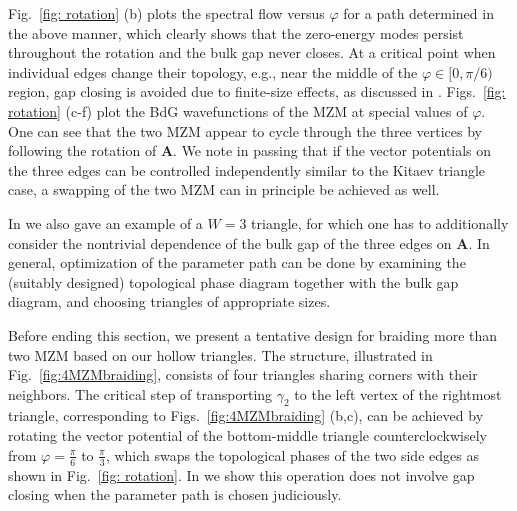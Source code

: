 Fig.~\ref{fig: rotation} (b) plots the spectral flow versus $\varphi$ for a path determined in the above manner, which clearly shows that the zero-energy modes persist throughout the rotation and the bulk gap never closes. At a critical point when individual edges change their topology, e.g., near the middle of the $\varphi\in [0,\pi/6)$ region, gap closing is avoided due to finite-size effects, as discussed in \cite{aliceaNonAbelianStatisticsTopological2011}. Figs.~\ref{fig: rotation} (c-f) plot the BdG wavefunctions of the MZM at special values of $\varphi$. One can see that the two MZM appear to cycle through the three vertices by following the rotation of $\mathbf A$. We note in passing that if the vector potentials on the three edges can be controlled independently similar to the Kitaev triangle case, a swapping of the two MZM can in principle be achieved as well.

In \cite{supp} we also gave an example of a $W=3$ triangle, for which one has to additionally consider the nontrivial dependence of the bulk gap of the three edges on $\mathbf A$. In general, optimization of the parameter path can be done by examining the (suitably designed) topological phase diagram together with the bulk gap diagram, and choosing triangles of appropriate sizes.

Before ending this section, we present a tentative design for braiding more than two MZM based on our hollow triangles. The structure, illustrated in Fig.~\ref{fig:4MZMbraiding}, consists of four triangles sharing corners with their neighbors. The critical step of transporting $\gamma_2$ to the left vertex of the rightmost triangle, corresponding to Figs.~\ref{fig:4MZMbraiding} (b,c), can be achieved by rotating the vector potential of the bottom-middle triangle counterclockwisely from $\varphi = \frac{\pi}{6}$ to $\frac{\pi}{3}$, which swaps the topological phases of the two side edges as shown in Fig.~\ref{fig: rotation}. In \cite{supp} we show this operation does not involve gap closing when the parameter path is chosen judiciously.

